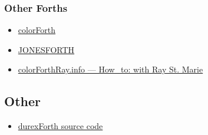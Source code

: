 \subsubsection{Other Forths}

\begin{itemize}
\item \href{http://www.colorforth.com/cf.html}{colorForth}
\item \href{http://www.annexia.org/forth}{JONESFORTH}
\item \href{http://colorforthray.info/}{colorForthRay.info --- How\_to: with Ray St. Marie}
\end{itemize}

\subsection{Other}

\begin{itemize}
\item \href{http://code.google.com/p/durexforth/}{durexForth source code}
\end{itemize}
